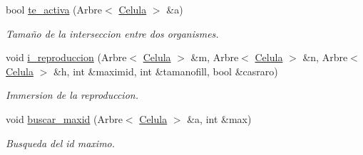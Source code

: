 \begin{DoxyCompactItemize}
bool \hyperlink{class_organisme_a52d94598bdac2bcf8264f3cc48b7193a}{te\-\_\-activa} (Arbre$<$ \hyperlink{class_celula}{Celula} $>$ \&a)
\begin{DoxyCompactList}\small\item\em Tamaño de la interseccion entre dos organismes. \end{DoxyCompactList}\item 
void \hyperlink{class_organisme_a3344f2b519e7b3bd296803d5e37ecfc1}{i\-\_\-reproduccion} (Arbre$<$ \hyperlink{class_celula}{Celula} $>$ \&m, Arbre$<$ \hyperlink{class_celula}{Celula} $>$ \&n, Arbre$<$ \hyperlink{class_celula}{Celula} $>$ \&h, int \&maximid, int \&tamanofill, bool \&casraro)
\begin{DoxyCompactList}\small\item\em Immersion de la reproduccion. \end{DoxyCompactList}\item 
void \hyperlink{class_organisme_a187a622878cb4d617aa326aac94787b4}{buscar\-\_\-maxid} (Arbre$<$ \hyperlink{class_celula}{Celula} $>$ \&a, int \&max)
\begin{DoxyCompactList}\small\item\em Busqueda del id maximo. \end{DoxyCompactList}\end{DoxyCompactItemize}
